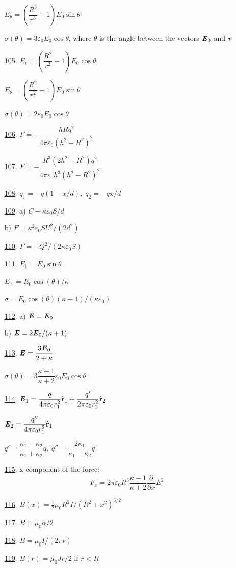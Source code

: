 \documentclass[11pt]{article}
\begin{document}
\begin{multicols}{2}
\begin{enumerate}
	$E_\theta=\left(\dfrac{R^3}{r^3}-1\right)E_0\sin\theta$
	
	$\sigma(\theta)=3\varepsilon_0E_0\cos\theta$, where $\theta$ is the angle between the vectors $\textbf{\textit{E}}_0$ and $\textbf{\textit{r}}$ %
	\item [\hyperlink{P105}{105}.] $E_r=\left(\dfrac{R^2}{r^2}+1\right)E_0\cos\theta$
	
	$E_\theta=\left(\dfrac{R^2}{r^2}-1\right)E_0\sin\theta$
	
	$\sigma(\theta)=2\varepsilon_0E_0\cos\theta$ %
	\item [\hyperlink{P106}{106}.] $F=-\dfrac{hRq^2}{4\pi\varepsilon_0(h^2-R^2)^2}$ %
	\item [\hyperlink{P107}{107}.] $F=-\dfrac{R^3(2h^2-R^2)q^2}{4\pi\varepsilon_0h^3(h^2-R^2)^2}$ %
	\item [\hyperlink{P108}{108}.] $q_1=-q(1-x/d),\;q_2=-qx/d$ %
	\item [\hyperlink{P109}{109}.] a) $C-\kappa\varepsilon_0S/d$
	
	b) $F=\kappa^2\varepsilon_0SU^2/(2d^2)$ %
	\item [\hyperlink{P110}{110}.] $F=-Q^2/(2\kappa\varepsilon_0S)$ %
	\item [\hyperlink{P111}{111}.] $E_\parallel=E_0\sin\theta$
	
	$E_\bot=E_0\cos(\theta)/\kappa$
	
	$\sigma=E_0\cos(\theta)(\kappa-1)/(\kappa\varepsilon_0)$ %
	\item [\hyperlink{P112}{112}.] a) $\textbf{\textit{E}}=\textbf{\textit{E}}_0$
	
	b) $\textbf{\textit{E}}=2\textbf{\textit{E}}_0/(\kappa+1)$ %
	\item [\hyperlink{P113}{113}.] $\textbf{\textit{E}}=\dfrac{3\textbf{\textit{E}}_0}{2+\kappa}$
	
	$\sigma(\theta)=3\dfrac{\kappa-1}{\kappa+2}\varepsilon_0E_0\cos\theta$ %
	\item [\hyperlink{P114}{114}.] $\textbf{\textit{E}}_1=\dfrac{q}{4\pi\varepsilon_0r_1^2}\hat{\textbf{r}}_1+\dfrac{q'}{2\pi\varepsilon_0r_2^2}\hat{\textbf{r}}_2$
	
	$\textbf{\textit{E}}_2=\dfrac{q''}{4\pi\varepsilon_0r_1^2}\hat{\textbf{r}}_1$
	
	$q'=\dfrac{\kappa_1-\kappa_2}{\kappa_1+\kappa_2}q,\;q''=\dfrac{2\kappa_1}{\kappa_1+\kappa_2}q$ %
	\item [\hyperlink{P115}{115}.] x-component of the force:
	$$F_x=2\pi\varepsilon_0R^3\dfrac{\kappa-1}{\kappa+2}\dfrac{\partial}{\partial x}E^2$$ %
	\item [\hyperlink{P116}{116}.] $B(x)=\frac{1}{2}\mu_0R^2I/(R^2+x^2)^{3/2}$ %
	\item [\hyperlink{P117}{117}.] $B=\mu_0\alpha/2$ %
	\item [\hyperlink{P118}{118}.] $B=\mu_0I/(2\pi r)$ %
	\item [\hyperlink{P119}{119}.] $B(r)=\mu_0Jr/2$ if $r<R$
	

\end{enumerate}
\end{multicols}
\end{document}
